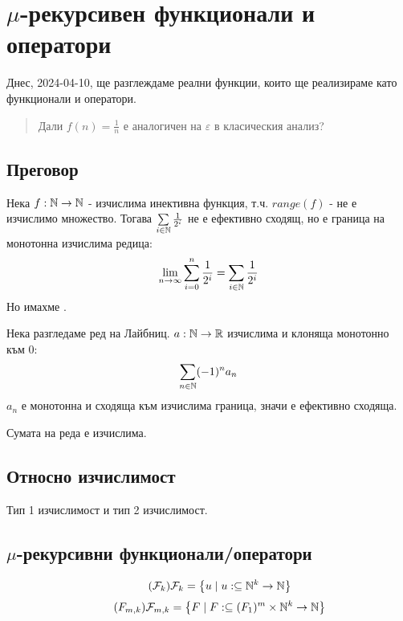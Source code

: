 \section{$\mu$-рекурсивен функционали и оператори}
Днес, 2024-04-10, ще разглеждаме реални функции, които ще реализираме като функционали и оператори.
\begin{quote}
    Дали $f(n) = \frac{1}{n}$ е аналогичен на $\varepsilon$ в класическия анализ?
\end{quote}

\subsection{Преговор}
Нека $f:{\mathbb{N}}\to{\mathbb{N}}$ - изчислима инективна функция, т.ч. $range(f)$ - не е изчислимо множество. Тогава $\sum\limits_{i\in{\mathbb{N}}} \frac{1}{2^i}$ не е ефективно сходящ, но е граница на монотонна изчислима редица:
\begin{equation}
    \lim\limits_{n\to\infty}\sum\limits_{i=0}^n \frac{1}{2^i} = \sum\limits_{i\in{\mathbb{N}}} \frac{1}{2^i}
\end{equation}
Но имахме .

Нека разгледаме ред на Лайбниц. $a: {\mathbb{N}}\to{\mathbb{R}}$ изчислима и клоняща монотонно към 0:
\begin{equation}
    \sum\limits_{n\in{\mathbb{N}}} (-1)^n a_n
\end{equation}
$a_n$ е монотонна и сходяща към изчислима граница, значи е ефективно сходяща.

Сумата на реда е изчислима.

\subsection{Относно изчислимост}
Тип 1 изчислимост и тип 2 изчислимост.

\subsection{$\mu$-рекурсивни функционали/оператори}
\begin{definition}
    \begin{equation}\tag{$\mathcal F_k$}
        \mathcal F_k = \left\{ u \mid u: \subseteq {\mathbb{N}}^k \to {\mathbb{N}} \right\}
    \end{equation}
    \begin{equation}\tag{$F_{m,k}$}
        \mathcal F_{m,k} = \left\{ F \mid F: \subseteq \mathcal (F_1)^m \times \N^k \to \N \right\}
    \end{equation}
\end{definition}

